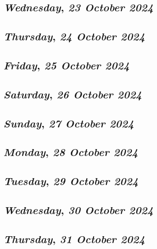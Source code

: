 \def\day{\textit{23 October 2024}}
\def\weekday{\textit{Wednesday}}
\subsection*{\weekday, \day}

\def\day{\textit{24 October 2024}}
\def\weekday{\textit{Thursday}}
\subsection*{\weekday, \day}

\def\day{\textit{25 October 2024}}
\def\weekday{\textit{Friday}}
\subsection*{\weekday, \day}

\def\day{\textit{26 October 2024}}
\def\weekday{\textit{Saturday}}
\subsection*{\weekday, \day}

\def\day{\textit{27 October 2024}}
\def\weekday{\textit{Sunday}}
\subsection*{\weekday, \day}

\def\day{\textit{28 October 2024}}
\def\weekday{\textit{Monday}}
\subsection*{\weekday, \day}

\def\day{\textit{29 October 2024}}
\def\weekday{\textit{Tuesday}}
\subsection*{\weekday, \day}

\def\day{\textit{30 October 2024}}
\def\weekday{\textit{Wednesday}}
\subsection*{\weekday, \day}

\def\day{\textit{31 October 2024}}
\def\weekday{\textit{Thursday}}
\subsection*{\weekday, \day}
